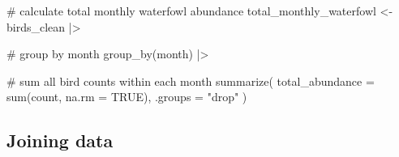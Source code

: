\documentclass[
  letterpaper,
  DIV=11,
  numbers=noendperiod]{scrartcl}
\newenvironment{Shaded}{\begin{snugshade}}{\end{snugshade}}
\newcommand{\AttributeTok}[1]{\textcolor[rgb]{0.40,0.45,0.13}{#1}}
\newcommand{\CommentTok}[1]{\textcolor[rgb]{0.37,0.37,0.37}{#1}}
\newcommand{\ConstantTok}[1]{\textcolor[rgb]{0.56,0.35,0.01}{#1}}
\newcommand{\FunctionTok}[1]{\textcolor[rgb]{0.28,0.35,0.67}{#1}}
\newcommand{\NormalTok}[1]{\textcolor[rgb]{0.00,0.23,0.31}{#1}}
\newcommand{\OtherTok}[1]{\textcolor[rgb]{0.00,0.23,0.31}{#1}}
\newcommand{\SpecialCharTok}[1]{\textcolor[rgb]{0.37,0.37,0.37}{#1}}
\newcommand{\StringTok}[1]{\textcolor[rgb]{0.13,0.47,0.30}{#1}}
\begin{document}
\begin{Shaded}
\begin{Highlighting}[]
\CommentTok{\# calculate total monthly waterfowl abundance}
\NormalTok{total\_monthly\_waterfowl }\OtherTok{\textless{}{-}}\NormalTok{ birds\_clean }\SpecialCharTok{|\textgreater{}}
  
  \CommentTok{\# group by month}
  \FunctionTok{group\_by}\NormalTok{(month) }\SpecialCharTok{|\textgreater{}}
  
  \CommentTok{\# sum all bird counts within each month}
  \FunctionTok{summarize}\NormalTok{(}
    \AttributeTok{total\_abundance =} \FunctionTok{sum}\NormalTok{(count, }\AttributeTok{na.rm =} \ConstantTok{TRUE}\NormalTok{),}
    \AttributeTok{.groups =} \StringTok{"drop"}
\NormalTok{  )}
\end{Highlighting}
\end{Shaded}

\subsection{Joining data}\label{joining-data}
\end{document}
